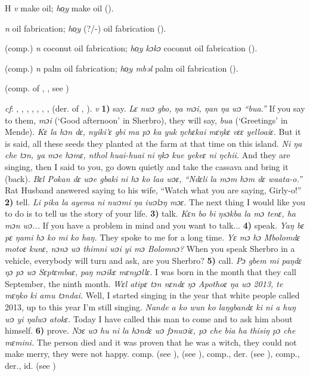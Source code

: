 \begin{letter}{H}
 \textit{v} make oil; \textit{ho̹y} make oil (\citealt{Pichl1967}).

 \textit{n} oil fabrication; \textit{ho̹y} (?/-) oil fabrication (\citealt{Pichl1967}). 

 (comp.) \textit{n} coconut oil fabrication; \textit{ho̹y kɔkɔ} coconut oil fabrication (\citealt{Pichl1967}). 

 (comp.) \textit{n} palm oil fabrication; \textit{ho̹y mbəl} palm oil fabrication (\citealt{Pichl1967}). 

 (comp. of , , see ) 

 \textit{cf}: , , , , , , ,  (der. of , ). \textit{v} \textbf{1)} say. \textit{Lɛ nwɔ gbo, ŋa mɔi, ŋan ŋa wɔ “bua.”} If you say to them, \textit{mɔi} (‘Good afternoon' in Sherbro), they will say, \textit{bua} (‘Greetings' in Mende). \textit{Kɛ la hɔn dɛ, nyiki'ɛ gbi ma pɔ ka yuk ŋchɛkai mɛŋkɛ vɛɛ yelloaiɛ.} But it is said, all these seeds they planted at the farm at that time on this island. \textit{Ni ŋa che tɔn, ya mɔe hɔmɛ, nthol huai-huai ni ŋkɔ kue yekeɛ ni ŋchii.} And they are singing, then I said to you, go down quietly and take the cassava and bring it (back). \textit{Bɛl Pokan dɛ wɔe gbaki ni hɔ ko laa wɔɛ, “Ndɛli la mɔm hɔm dɛ waata-o.”} Rat Husband answered saying to his wife, “Watch what you are saying, Girly-o!” \textbf{2)} tell. \textit{Li pika la ayema ni nwɔmi ŋa iwɔlɔŋ mɔɛ.} The next thing I would like you to do is to tell us the story of your life. \textbf{3)} talk. \textit{Kɛn bo bi ŋsɔkba la mɔ tenɛ, ha mɔn wɔ...} If you have a problem in mind and you want to talk... \textbf{4)} speak. \textit{Yaŋ bɛ pɛ ŋami hɔ ko mi ko haŋ.} They spoke to me for a long time. \textit{Yɛ mɔ hɔ Mbolomdɛ motoɛ kunɛ, nɔnɔ wɔ thimni wɔi yi mɔ Bolomnɔ?} When you speak Sherbro in a vehicle, everybody will turn and ask, are you Sherbro? \textbf{5)} call. \textit{Pɔ gbem mi paŋdɛ ŋɔ pɔ wɔ Sɛptɛmbaɛ, paŋ mɔikɛ mɛnyɔllɛ.} I was born in the month that they call September, the ninth month. \textit{Wɛl atipɛ tɔn nɛndɛ ŋɔ Apothoɛ ŋa wɔ 2013, te mɛŋko ki amu tɔndai.} Well, I started singing in the year that white people called 2013, up to this year I'm still singing. \textit{Nande a ko wun ko laŋgbandɛ ki ni a huŋ wɔ yi ŋalwɔ atokɛ.} Today I have called this man to come and to ask him about himself. \textbf{6)} prove. \textit{Nɔɛ wɔ hu ni la hɔndɛ wɔ fɔnwɔiɛ, pɔ che bia ha thisiŋ pɔ che mɛmini.} The person died and it was proven that he was a witch, they could not make merry, they were not happy. comp.  (see ),  (see ), comp., der.  (see ), comp., der., id.  (see )


\end{letter}
